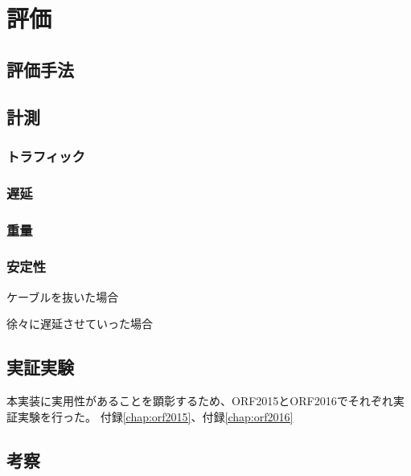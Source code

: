 \chapter{評価}
\label{chap:evaluation}

\section{評価手法}

\section{計測}

\subsection{トラフィック}

\subsection{遅延}

\subsection{重量}

\subsection{安定性}

ケーブルを抜いた場合

徐々に遅延させていった場合

\section{実証実験}
本実装に実用性があることを顕彰するため、ORF2015とORF2016でそれぞれ実証実験を行った。
付録\ref{chap:orf2015}、付録\ref{chap:orf2016}

\section{考察}
